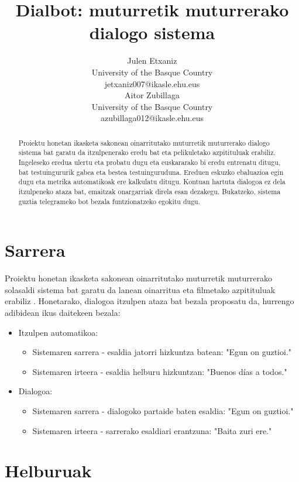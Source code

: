 \documentclass[11pt,a4paper]{article}
\title{Dialbot: muturretik muturrerako dialogo sistema}
\author{Julen Etxaniz \\
  University of the Basque Country \\
  jetxaniz007@ikasle.ehu.eus \\\And
  Aitor Zubillaga \\
  University of the Basque Country \\
  azubillaga012@ikasle.ehu.eus \\}
\date{}
\begin{document}
\maketitle

\begin{abstract}
Proiektu honetan ikasketa sakonean oinarritutako muturretik muturrerako dialogo sistema bat garatu da itzulpenerako eredu bat eta pelikuletako azpitituluak erabiliz. Ingeleseko eredua ulertu eta probatu dugu eta euskararako bi eredu entrenatu ditugu, bat testuingururik gabea eta bestea testuinguruduna. Ereduen eskuzko ebaluazioa egin dugu eta metrika automatikoak ere kalkulatu ditugu. Kontuan hartuta dialogoa ez dela itzulpeneko ataza bat, emaitzak onargarriak direla esan dezakegu. Bukatzeko, sistema guztia telegrameko bot bezala funtzionatzeko egokitu dugu.
\end{abstract}

\section{Sarrera}

Proiektu honetan ikasketa sakonean oinarritutako muturretik muturrerako solasaldi sistema bat garatu da \citep{bahdanau2014neural} lanean oinarritua eta filmetako azpitituluak erabiliz \citep{lison2016opensubtitles2016}. Honetarako, dialogoa itzulpen ataza bat bezala proposatu da, hurrengo adibidean ikus daitekeen bezala:

\begin{itemize}
   \item Itzulpen automatikoa:
   \begin{itemize}
     \item Sistemaren sarrera - esaldia jatorri hizkuntza batean: "Egun on guztioi."
     \item Sistemaren irteera - esaldia helburu hizkuntzan: "Buenos días a todos."
   \end{itemize}
   \item Dialogoa:
   \begin{itemize}
     \item Sistemaren sarrera - dialogoko partaide baten esaldia: "Egun on guztioi."
     \item Sistemaren irteera - sarrerako esaldiari erantzuna: "Baita zuri ere."
   \end{itemize}
\end{itemize}

\section{Helburuak}
\end{document}
